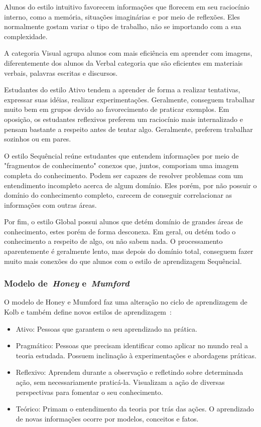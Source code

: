 Alunos do estilo intuitivo favorecem informações que florecem em seu raciocínio interno, como a memória, situações imaginárias e por meio de reflexões. Eles normalmente gostam variar o tipo de trabalho, não se importando com a sua complexidade.

A categoria Visual agrupa alunos com mais eficiência em aprender com imagens, diferentemente dos alunos da Verbal categoria que são eficientes em materiais verbais, palavras escritas e discursos.

Estudantes do estilo Ativo tendem a aprender de forma a realizar tentativas, expressar suas idéias, realizar experimentações. Geralmente, conseguem trabalhar muito bem em grupos devido ao favorecimento de praticar exemplos. Em oposição, os estudantes reflexivos preferem um raciocínio mais internalizado e pensam bastante a respeito antes de tentar algo. Geralmente, preferem trabalhar sozinhos ou em pares.

O estilo Sequêncial reúne estudantes que entendem informações por meio de "fragmentos de conhecimento" conexos que, juntos, comporiam uma imagem completa do conhecimento. Podem ser capazes de resolver problemas com um entendimento incompleto acerca de algum domínio. Eles porém, por não possuir o domínio do conhecimento completo, carecem de conseguir correlacionar as informações com outras áreas.

Por fim, o estilo Global possui alunos que detém domínio de grandes áreas de conhecimento, estes porém de forma desconexa. Em geral, ou detém todo o conhecimento a respeito de algo, ou não sabem nada. O processamento aparentemente é geralmente lento, mas depois do domínio total, conseguem fazer muito mais conexões do que alunos com o estilo de aprendizagem Sequêncial.

\subsubsection{Modelo de~\emph{Honey} e~\emph{Mumford}}
O modelo de Honey e Mumford faz uma alteração no ciclo de aprendizagem de Kolb e também define novos estilos de aprendizagem~\cite{muhlbeier12}:
\begin{itemize}
	\item Ativo: Pessoas que garantem o seu aprendizado na prática.
	\item Pragmático: Pessoas que precisam identificar como aplicar no mundo real a teoria estudada. Possuem inclinação à experimentações e abordagens práticas.
	\item Reflexivo: Aprendem durante a observação e refletindo sobre determinada ação, sem necessariamente praticá-la. Visualizam a ação de diversas perspectivas para fomentar o seu conhecimento.
	\item Teórico: Primam o entendimento da teoria por trás das ações. O aprendizado de novas informações ocorre por modelos, conceitos e fatos.

\end{itemize}

